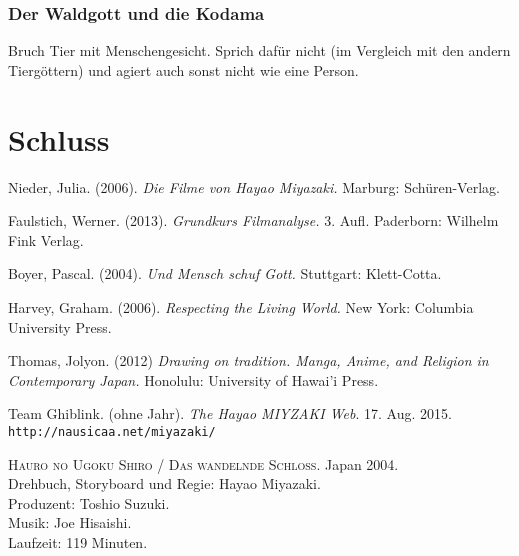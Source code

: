 \documentclass[a4paper]{article}
\begin{document}
\subsubsection*{Der Waldgott und die Kodama}
Bruch Tier mit Menschengesicht. Sprich dafür nicht (im Vergleich mit den andern Tiergöttern) und agiert auch sonst nicht wie eine Person.

\section{Schluss}

\newpage
\begin{thebibliography}{9}

	Nieder, Julia. 
	(2006). 
	\emph{Die Filme von Hayao Miyazaki.}
	Marburg: Schüren-Verlag.

	Faulstich, Werner.
	(2013).
	\emph{Grundkurs Filmanalyse.} 
	3. Aufl. 
	Paderborn: Wilhelm Fink Verlag.

	Boyer, Pascal.
	(2004).
	\emph{Und Mensch schuf Gott.}
	Stuttgart: Klett-Cotta.

	Harvey, Graham.
	(2006).
	\emph{Respecting the Living World.}
	New York: Columbia University Press.

	Thomas, Jolyon.
	(2012)
	\emph{Drawing on tradition. Manga, Anime, and Religion in Contemporary Japan.}
	Honolulu: University of Hawai'i Press.

	Team Ghiblink. 
	(ohne Jahr). 
	\emph{The Hayao MIYZAKI Web}. 
	17. Aug. 2015. 
	\texttt{http://nausicaa.net/miyazaki/}

	\textsc{Hauro no Ugoku Shiro / Das wandelnde Schloss}.
	Japan 2004. \\
	Drehbuch, Storyboard und Regie: Hayao Miyazaki.\\
	Produzent: Toshio Suzuki. \\
	Musik: Joe Hisaishi. \\
	Laufzeit: 119 Minuten. \\

\end{thebibliography}
\end{document}
